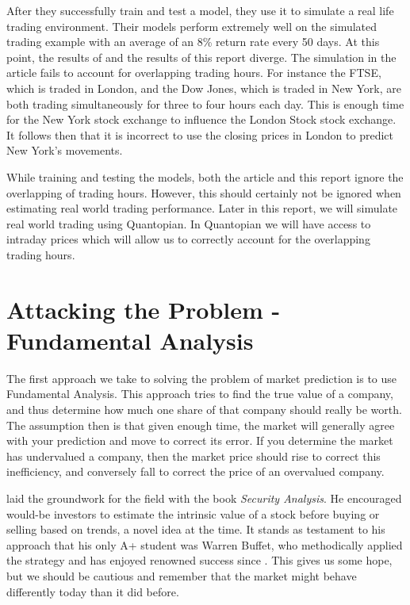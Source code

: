 \documentclass{report}
\begin{document}
After they successfully train and test a model, they use it to simulate a real life trading environment. Their models perform extremely well on the simulated trading example with an average of an 8\% return rate every 50 days. At this point, the results of \citet{shen2012stock} and the results of this report diverge. The simulation in the article fails to account for overlapping trading hours. For instance the FTSE, which is traded in London, and the Dow Jones, which is traded in New York, are both trading simultaneously for three to four hours each day. This is enough time for the New York stock exchange to influence the London Stock stock exchange. It follows then that it is incorrect to use the closing prices in London to predict New York's movements.

While training and testing the models, both the article and this report ignore the overlapping of trading hours. However, this should certainly not be ignored when estimating real world trading performance. Later in this report, we will simulate real world trading using Quantopian. In Quantopian we will have access to intraday prices which will allow us to correctly account for the overlapping trading hours.  

\chapter{Attacking the Problem - Fundamental Analysis}

The first approach we take to solving the problem of market prediction is to use Fundamental Analysis. This approach tries to find the true value of a company, and thus determine how much one share of that company should really be worth. The assumption then is that given enough time, the market will generally agree with your prediction and move to correct its error. If you determine the market has undervalued a company, then the market price should rise to correct this inefficiency, and conversely fall to correct the price of an overvalued company. 

\citet{graham1934security} laid the groundwork for the field with the book \textit{Security Analysis}. He encouraged would-be investors to estimate the intrinsic value of a stock before buying or selling based on trends, a novel idea at the time. It stands as testament to his approach that his only A+ student was Warren Buffet, who methodically applied the strategy and has enjoyed renowned success since \cite{schroeder2008snowball}. This gives us some hope, but we should be cautious and remember that the market might behave differently today than it did before.
\end{document}
